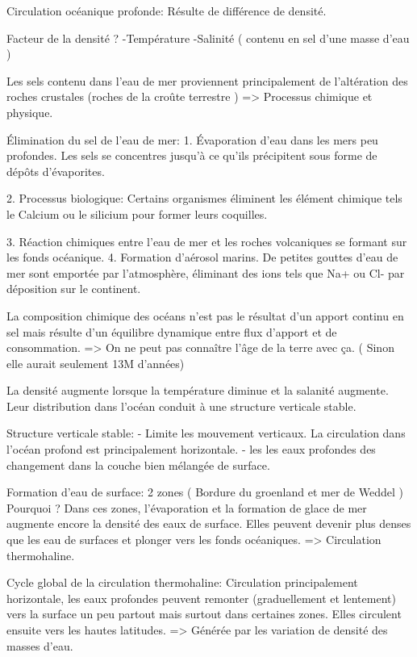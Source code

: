   







Circulation océanique profonde:
Résulte de différence de densité.


Facteur de la densité ?
-Température
-Salinité ( contenu en sel d’une masse d’eau )


Les sels contenu dans l’eau de mer proviennent principalement de l’altération des roches crustales (roches de la croûte terrestre ) => Processus chimique et physique.




Élimination du sel de l’eau de mer:
1. Évaporation d’eau dans les mers peu profondes. Les sels se concentres jusqu'à ce qu’ils précipitent sous forme de dépôts d’évaporites.


2. Processus biologique: Certains organismes éliminent les élément chimique tels le Calcium ou le silicium pour former leurs coquilles.


3. Réaction chimiques entre l’eau de mer et les roches volcaniques se formant sur les fonds océanique.
4. Formation d’aérosol marins. De petites gouttes d’eau de mer sont emportée par l’atmosphère, éliminant des ions tels que Na+ ou Cl- par déposition sur le continent.


La composition chimique des océans n’est pas le résultat d’un apport continu en sel mais résulte d’un équilibre dynamique entre flux d’apport et de consommation.
=> On ne peut pas connaître l’âge de la terre avec ça. ( Sinon elle aurait seulement 13M d’années)




La densité augmente lorsque la température diminue et la salanité augmente.
Leur distribution dans l’océan conduit à une structure verticale stable.


Structure verticale stable:
- Limite les mouvement verticaux. La circulation dans l’océan profond est principalement horizontale.
- les les eaux profondes des changement dans la couche bien mélangée de surface.




Formation d’eau de surface: 2 zones ( Bordure du groenland et mer de Weddel )
Pourquoi ? Dans ces zones, l’évaporation et la formation de glace de mer augmente encore la densité des eaux de surface. Elles peuvent devenir plus denses que les eau de surfaces et plonger vers les fonds océaniques.
=> Circulation thermohaline.


Cycle global de la circulation thermohaline:
Circulation principalement horizontale, les eaux profondes peuvent remonter (graduellement et lentement) vers la surface un peu partout mais surtout dans certaines zones. Elles circulent ensuite vers les hautes latitudes.
=> Générée par les variation de densité des masses d’eau.


